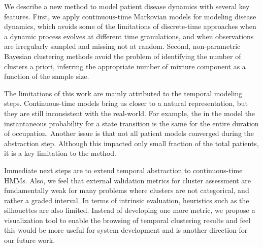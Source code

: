 We describe a new method to model patient disease dynamics with several key features.  First, we apply continuous-time Markovian models for modeling disease dynamics, which avoids some of the limitations of discrete-time approaches when a dynamic process evolves at different time granulations, and when observations are irregularly sampled and missing not at random.  Second, non-parametric Bayesian clustering methods avoid the problem of identifying the number of clusters a priori, inferring the appropriate number of mixture component as a function of the sample size.

 The limitations of this work are mainly attributed to the temporal modeling steps. Continuous-time models bring us closer to a natural representation, but they are still inconsistent with the real-world. For example, the in the model the instantaneous probability for a state transition is the same for the entire duration of occupation.  Another issue is that not all patient models converged during the abstraction step.  Although this impacted only small fraction of the total patients, it is a key limitation to the method. 

  Immediate next steps are to extend temporal abstraction to continuous-time HMMs.  Also, we feel that external validation metrics for cluster assessment are fundamentally weak for many problems where clusters are not categorical, and rather a graded interval. In terms of intrinsic evaluation, heuristics such as the silhouettes are also limited.  Instead of developing one more metric, we propose a visualization tool to enable the browsing of temporal clustering results and feel this would be more useful for system development and is another direction for our future work.

